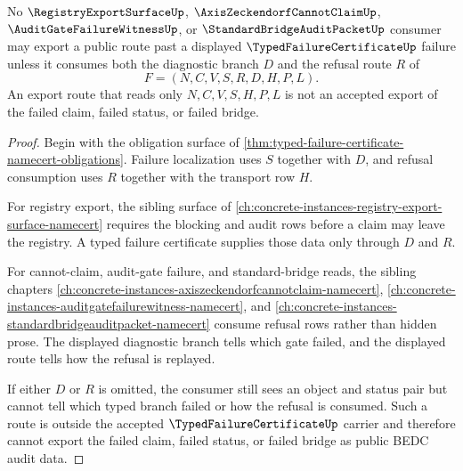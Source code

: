 \begin{theorem}
\label{thm:typed-failure-certificate-export-blocking}
No $\RegistryExportSurfaceUp$, $\AxisZeckendorfCannotClaimUp$, $\AuditGateFailureWitnessUp$, or $\StandardBridgeAuditPacketUp$ consumer may export a public route past a displayed $\TypedFailureCertificateUp$ failure unless it consumes both the diagnostic branch $D$ and the refusal route $R$ of
$$
F=(N,C,V,S,R,D,H,P,L).
$$
An export route that reads only $N,C,V,S,H,P,L$ is not an accepted export of the failed claim, failed status, or failed bridge.
\end{theorem}
\begin{proof}
Begin with the obligation surface of \autoref{thm:typed-failure-certificate-namecert-obligations}. Failure localization uses $S$ together with $D$, and refusal consumption uses $R$ together with the transport row $H$.

For registry export, the sibling surface of \autoref{ch:concrete-instances-registry-export-surface-namecert} requires the blocking and audit rows before a claim may leave the registry. A typed failure certificate supplies those data only through $D$ and $R$.

For cannot-claim, audit-gate failure, and standard-bridge reads, the sibling chapters \autoref{ch:concrete-instances-axiszeckendorfcannotclaim-namecert}, \autoref{ch:concrete-instances-auditgatefailurewitness-namecert}, and \autoref{ch:concrete-instances-standardbridgeauditpacket-namecert} consume refusal rows rather than hidden prose. The displayed diagnostic branch tells which gate failed, and the displayed route tells how the refusal is replayed.

If either $D$ or $R$ is omitted, the consumer still sees an object and status pair but cannot tell which typed branch failed or how the refusal is consumed. Such a route is outside the accepted $\TypedFailureCertificateUp$ carrier and therefore cannot export the failed claim, failed status, or failed bridge as public BEDC audit data.
\end{proof}

